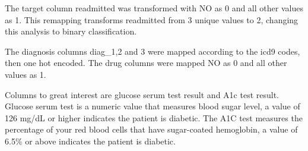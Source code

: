 \documentclass[5p]{elsarticle} %
\begin{document}
The target column readmitted was transformed with NO as 0 and all other
values as 1. This remapping transforms readmitted from 3 unique values
to 2, changing this analysis to binary classification.

The diagnosis columns diag\_1,2 and 3 were mapped according to the icd9
codes, then one hot encoded. The drug columns were mapped NO as 0 and
all other values as 1.

Columns to great interest are glucose serum test result and A1c test
result. Glucose serum test is a numeric value that measures blood sugar
level, a value of 126 mg/dL or higher indicates the patient is diabetic.
The A1C test measures the percentage of your red blood cells that have
sugar-coated hemoglobin, a value of 6.5\% or above indicates the patient
is diabetic.

\clearpage
\onecolumn
\end{document}
